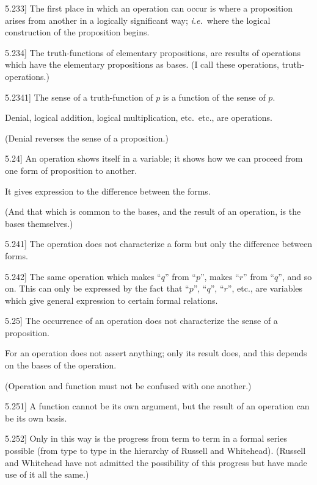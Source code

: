 \documentclass[12pt,oneside]{book}[2007/10/19]
\newcommand{\PropositionE}[2]{%
  \item[\phantomsection\label{PropE:#1}\PropGRef{#1}] #2%
}
\newcommand{\PropGRef}[1]{\hyperref[PropG:#1]{#1}}
\newcommand{\DPtypo}[2]{#2}
\newcommand{\idEst}{\textit{i.e.}}
\begin{document}
\begin{propositions}
\PropositionE{5.233}
{The first place in which an operation can occur
is where a proposition arises from another in a
logically significant way; \idEst\ where the logical
construction of the proposition begins.}


\PropositionE{5.234}
{The truth-functions of elementary \DPtypo{proposition}{propositions},
are results of operations which have the elementary
propositions as bases. (I call these
operations, truth-operations.)}


\PropositionE{5.2341}
{The sense of a truth-function of $p$ is a function
of the sense of $p$.

Denial, logical addition, logical multiplication,
etc.\ etc., are operations.

(Denial reverses the sense of a proposition.)}


\PropositionE{5.24}
{An operation shows itself in a variable; it shows
how we can proceed from one form of proposition
to another.

It gives expression to the difference between
the forms.

(And that which is common to the bases, and
the result of an operation, is the bases themselves.)}


\PropositionE{5.241}
{The operation does not characterize a form but
only the difference between forms.}


\PropositionE{5.242}
{The same operation which makes ``$q$'' from
``$p$'', makes ``$r$'' from ``$q$'', and so on. This
can only be expressed by the fact that ``$p$'', ``$q$'',
``$r$'', etc., are variables which give general expression
\enlargethispage{10pt} %
to certain formal relations.}


\PropositionE{5.25}
{The occurrence of an operation does not characterize
the sense of a proposition.

For an operation does not assert anything; only
its result does, and this depends on the bases of
the operation.

(Operation and function must not be confused
with one another.)}


\PropositionE{5.251}
{A function cannot be its own argument, but
the result of an operation can be its own
basis.}


\PropositionE{5.252}
{Only in this way is the progress from term
to term in a formal series possible (from type
to type in the hierarchy of Russell and Whitehead).
(Russell and Whitehead have not admitted
the possibility of this progress but have made use
of it all the same.)}



\end{propositions}
\end{document}
